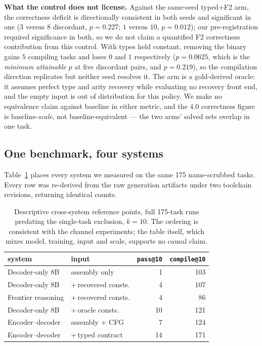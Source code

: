 \documentclass[conference]{IEEEtran}
\makeatletter
\newcommand{\passat}[1]{\texttt{pass@#1}\xspace}
\newcommand{\compileat}[1]{\texttt{compile@#1}\xspace}
\makeatother
\begin{document}
\textbf{What the control does not license.} Against the same-seed typed$+$F2 arm,
the correctness deficit is directionally consistent in both seeds and significant
in one ($3$ versus $8$ discordant, $p{=}0.227$; $1$ versus $10$, $p{=}0.012$);
our pre-registration required significance in both, so we do not claim a
quantified F2 correctness contribution from this control. With types held
constant, removing the binary gains $5$ compiling tasks and loses $0$ and $1$
respectively ($p{=}0.0625$, which is the \emph{minimum attainable} $p$ at five
discordant pairs, and $p{=}0.219$), so the compilation direction replicates but
neither seed resolves it. The arm is a gold-derived oracle: it assumes perfect
type and arity recovery while evaluating no recovery front end, and the empty
input is out of distribution for this policy. We make no equivalence claim
against baseline in either metric, and the $4.0$ correctness figure is
baseline-\emph{scale}, not baseline-equivalent --- the two arms' solved sets
overlap in one task.

\subsection{One benchmark, four systems}
Table~\ref{tab:unified} places every system we measured on the same 175
name-scrubbed tasks. Every row was re-derived from the raw generation artifacts
under two toolchain revisions, returning identical counts.

\begin{table}[t]
\caption{Descriptive cross-system reference points, full 175-task runs predating
the single-task exclusion, $k{=}10$. The ordering is consistent with the channel
experiments; the table itself, which mixes model, training, input and scale,
supports no causal claim.}
\label{tab:unified}
\centering
\footnotesize
\begin{tabular}{@{}llrr@{}}
\toprule
\textbf{system} & \textbf{input} & \textbf{\passat{10}} & \textbf{\compileat{10}} \\
\midrule
Decoder-only 8B    & assembly only        & 1  & 103 \\
Decoder-only 8B    & +\,recovered consts. & 4  & 107 \\
Frontier reasoning & +\,recovered consts. & 4  & 86  \\
Decoder-only 8B    & +\,oracle consts.    & 10 & 121 \\
Encoder--decoder   & assembly + CFG       & 7  & 124 \\
Encoder--decoder   & +\,typed contract    & 14 & 171 \\
\bottomrule
\end{tabular}
\end{table}
\end{document}
